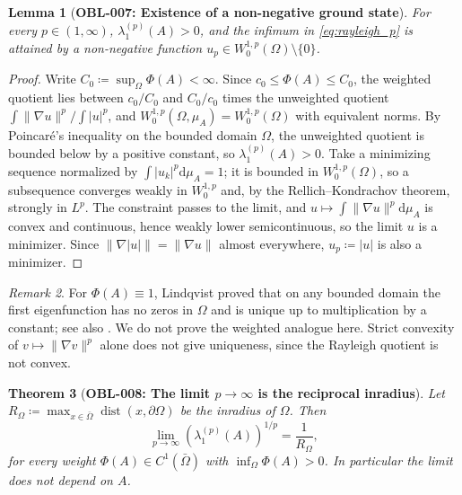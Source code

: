 \documentclass[11pt,a4paper,reqno]{amsart}
\newtheorem{theorem}{Theorem}[section]
\newtheorem{lemma}[theorem]{Lemma}
\theoremstyle{definition}
\theoremstyle{remark}
\newtheorem{remark}[theorem]{Remark}
\numberwithin{equation}{section}
\newcommand{\dif}{\mathrm{d}}
\begin{document}
\begin{lemma}[\textbf{OBL-007: Existence of a non-negative ground state}]
\label{lem:p_laplacian_minimax}
For every $p \in (1, \infty)$, $\lambda_1^{(p)}(A) > 0$, and the infimum in \eqref{eq:rayleigh_p} is attained by a non-negative function $u_p \in W_0^{1,p}(\Omega)\setminus\{0\}$.
\end{lemma}

\begin{proof}
Write $C_0 \coloneqq \sup_\Omega \Phi(A) < \infty$. Since $c_0 \le \Phi(A) \le C_0$, the weighted quotient lies between $c_0/C_0$ and $C_0/c_0$ times the unweighted quotient $\int\|\nabla u\|^p/\int|u|^p$, and $W_0^{1,p}(\Omega,\mu_A) = W_0^{1,p}(\Omega)$ with equivalent norms. By Poincaré's inequality on the bounded domain $\Omega$, the unweighted quotient is bounded below by a positive constant, so $\lambda_1^{(p)}(A) > 0$. Take a minimizing sequence normalized by $\int|u_k|^p\dif\mu_A = 1$; it is bounded in $W_0^{1,p}(\Omega)$, so a subsequence converges weakly in $W_0^{1,p}$ and, by the Rellich--Kondrachov theorem, strongly in $L^p$. The constraint passes to the limit, and $u \mapsto \int\|\nabla u\|^p\dif\mu_A$ is convex and continuous, hence weakly lower semicontinuous, so the limit $u$ is a minimizer. Since $\|\nabla|u|\| = \|\nabla u\|$ almost everywhere, $u_p \coloneqq |u|$ is also a minimizer.
\end{proof}

\begin{remark}
For $\Phi(A) \equiv 1$, Lindqvist \cite{Lindqvist1990} proved that on any bounded domain the first eigenfunction has no zeros in $\Omega$ and is unique up to multiplication by a constant; see also \cite[Theorem~6]{Lindqvist2008}. We do not prove the weighted analogue here. Strict convexity of $v \mapsto \|\nabla v\|^p$ alone does not give uniqueness, since the Rayleigh quotient is not convex.
\end{remark}

\begin{theorem}[\textbf{OBL-008: The limit $p\to\infty$ is the reciprocal inradius}]
\label{thm:cheeger_p_limit}
Let $R_\Omega \coloneqq \max_{x \in \bar\Omega} \operatorname{dist}(x, \partial\Omega)$ be the inradius of $\Omega$. Then
\begin{equation}
\lim_{p \to \infty} \left( \lambda_1^{(p)}(A) \right)^{1/p} = \frac{1}{R_\Omega},
\end{equation}
for every weight $\Phi(A) \in C^1(\bar\Omega)$ with $\inf_\Omega \Phi(A) > 0$. In particular the limit does not depend on $A$.
\end{theorem}
\end{document}
